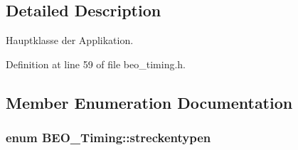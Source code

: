 \subsection{Detailed Description}
Hauptklasse der Applikation. 

Definition at line 59 of file beo\_\-timing.h.

\subsection{Member Enumeration Documentation}
\hypertarget{class_b_e_o___timing_83717794a488147bbcea59aceb9bd0c6}{
\subsubsection[streckentypen]{\setlength{\rightskip}{0pt plus 5cm}enum {\bf BEO\_\-Timing::streckentypen}}}
\label{class_b_e_o___timing_83717794a488147bbcea59aceb9bd0c6}


